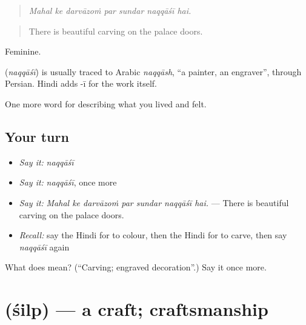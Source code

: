 \begin{quote}
      
\end{quote}

\begin{quote}
\emph{Mahal ke darvāzoṁ par sundar naqqāśī hai.}
\end{quote}

\begin{quote}
There is beautiful carving on the palace doors.
\end{quote}

Feminine.

\begin{cousinweb}
\textbf{} (\emph{naqqāśī}) is usually traced to Arabic \emph{naqqāsh}, \textquotedblleft{}a painter, an engraver\textquotedblright{}, through Persian. Hindi adds -ī for the work itself.
\end{cousinweb}

\begin{grammarlens}[title={What you've built}]
One more word for describing what you lived and felt.
\end{grammarlens}

\subsection*{Your turn}
\begin{itemize}
\raggedright
  \item \emph{Say it:} \emph{naqqāśī}
  \item \emph{Say it:} \emph{naqqāśī}, once more
  \item \emph{Say it:} \emph{Mahal ke darvāzoṁ par sundar naqqāśī hai.} — There is beautiful carving on the palace doors.
  \item \emph{Recall:} say the Hindi for to colour, then the Hindi for to carve, then say \emph{naqqāśī} again
\end{itemize}

\begin{tcolorbox}[breakable,colback=teal!4,colframe=teal!35!black,title={Before you move on}]
What does  mean? (\textquotedblleft{}Carving; engraved decoration\textquotedblright{}.) Say it once more.
\end{tcolorbox}
\section[\texorpdfstring{\hi{शिल्प} (śilp)}{शिल्प (śilp)}]{ (śilp) — a craft; craftsmanship}

